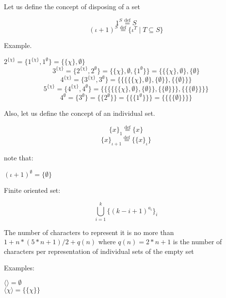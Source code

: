 \documentclass[10pt, a4paper]{article}
\newcommand*{\defeq}{\stackrel{\text{def}}{=}}
\begin{document}
\begin{multicols}{2}
Let us define the concept of disposing of a set
\begin{center}
\[1^S \defeq S\]
\[(\iota + 1)^S \defeq \{\iota^T \mid T \subseteq  S\}\]
\end{center}
Example.
\vspace{0.3cm}
\begin{center}
$2^{\{\chi\}} = \Big\{1^{\{\chi\}}, 1^\emptyset \Big\} = \{\{\chi\},\emptyset\}$
\[3^{\{\chi\}} = \Big\{2^{\{\chi\}}, 2^\emptyset \Big\} = \Big\{\{\chi\},\emptyset, \Big\{1^\emptyset \Big\}\Big\} = \{\{\{\chi\},\emptyset\}, \{\emptyset\}\]
\[4^{\{\chi\}} = \Big\{3^{\{\chi\}}, 3^\emptyset \Big\} = \{\{\{\{\{\chi\},\emptyset\},\{\emptyset\}\},\{\{\emptyset\}\}\}\]
\[5^{\{\chi\}} = \Big\{4^{\{\chi\}}, 4^\emptyset \Big\} = \{\{\{\{\{\{\chi\},\emptyset\},\{\emptyset\}\},\{\{\emptyset\}\}\}, \{\{\{\emptyset\}\}\}\}\]
\[4^\emptyset = \Big\{3^\emptyset\Big\} = \Big\{\Big\{2^\emptyset\Big\}\Big\} = \Big\{\Big\{\Big\{1^\emptyset\Big\}\Big\}\Big\} = \{\{\{\{\emptyset\}\}\}\}\]
\end{center}
\vspace{0.4cm}
Also, let us define the concept of an individual set.
\begin{center}
\[\{x\}_1 \defeq \{x\}\]
\[\{x\}_{\iota + 1} \defeq \{\{x\}_\iota\}\]
\end{center}
note that:
\begin{center}
    $(\iota + 1)^\emptyset = \{\emptyset\}$
\end{center}
Finite oriented set:
\begin{center}
\[\bigcup\limits^k_{i=1}\Big\{(k-i+1)^{a_i}\Big\}_i\]
\end{center}
The number of characters to represent it is no more than
$1 + n * (5 * n + 1) /2 + q (n)$ where $q(n) = 2 * n + 1$ is
the number of characters per representation of individual
sets of the empty set

Examples:
\vspace{0.4cm}
\begin{center}
$\langle \rangle = \emptyset$ \\
$\langle \chi \rangle = \{\{\chi\}\}$
\end{center}
\end{multicols}
\end{document}
